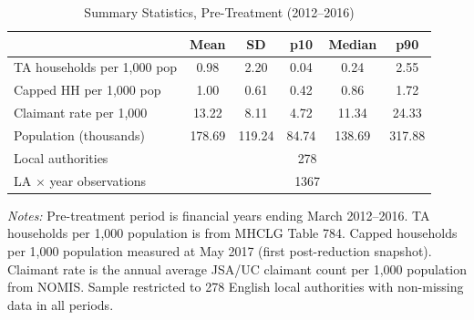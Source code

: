 \begin{table}[t]
\centering
\caption{Summary Statistics, Pre-Treatment (2012--2016)}
\label{tab:summary}
\begin{tabular}{lccccc}
\toprule
& Mean & SD & p10 & Median & p90 \\
\midrule
TA households per 1,000 pop & 0.98 & 2.20 & 0.04 & 0.24 & 2.55 \\
Capped HH per 1,000 pop & 1.00 & 0.61 & 0.42 & 0.86 & 1.72 \\
Claimant rate per 1,000 & 13.22 & 8.11 & 4.72 & 11.34 & 24.33 \\
Population (thousands) & 178.69 & 119.24 & 84.74 & 138.69 & 317.88 \\
\midrule
Local authorities & \multicolumn{5}{c}{278} \\
LA $\times$ year observations & \multicolumn{5}{c}{1367} \\
\bottomrule
\end{tabular}
\begin{tablenotes}[flushleft]\footnotesize
\item \textit{Notes:} Pre-treatment period is financial years ending March 2012--2016. TA households per 1,000 population is from MHCLG Table 784. Capped households per 1,000 population measured at May 2017 (first post-reduction snapshot). Claimant rate is the annual average JSA/UC claimant count per 1,000 population from NOMIS. Sample restricted to 278 English local authorities with non-missing data in all periods.
\end{tablenotes}
\end{table}
